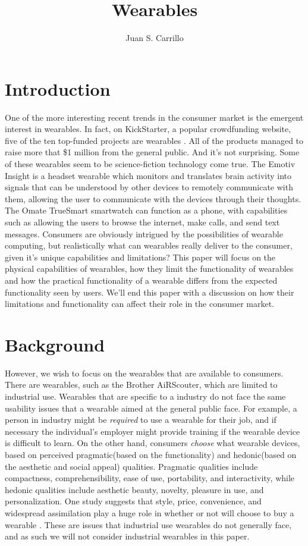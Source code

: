 \documentclass[11pt]{article}
\title{Wearables}
\author{Juan S. Carrillo}
\begin{document}
\maketitle
\section{Introduction}
One of the more interesting recent trends in the consumer market is the emergent interest in wearables. In fact, on KickStarter, a popular crowdfunding website, five of the ten top-funded projects are wearables \cite{VandricoTopTen}. All of the products managed to raise more that \$1 million from the general public. And it's not surprising. Some of these wearables seem to be science-fiction technology come true. The Emotiv Insight is a headset wearable which monitors and translates brain activity into signals that can be understood by other devices to remotely communicate with them, allowing the user to communicate with the devices through their thoughts. The Omate TrueSmart smartwatch can function as a phone, with capabilities such as allowing the users to browse the internet, make calls, and send text messages. Consumers are obviously intrigued by the possibilities of wearable computing, but realistically what can wearables really deliver to the consumer, given it's unique capabilities and limitations? This paper will focus on the physical capabilities of wearables, how they limit the functionality of wearables and how the practical functionality of a wearable differs from the expected functionality seen by users. We'll end this paper with a discussion on how their limitations and functionality can affect their role in the consumer market.
\section{Background}
 However, we wish to focus on the wearables that are available to consumers. There are wearables, such as the Brother AiRScouter, which are limited to industrial use. Wearables that are specific to a industry do not face the same usability issues that a wearable aimed at the general public face. For example, a person in industry might be \textit{required} to use a wearable for their job, and if necessary the individual's employer might provide training if the wearable device is difficult to learn. On the other hand, consumers \textit{choose} what wearable devices, based on perceived pragmatic(based on the functionality) and hedonic(based on the aesthetic and social appeal) qualities. Pragmatic qualities include compactness, comprehensibility, ease of use, portability, and interactivity, while hedonic qualities include aesthetic beauty, novelty, pleasure in use, and personalization\cite{UserAcceptance}. One study suggests that  style, price, convenience, and widespread assimilation play a huge role in whether or not will choose to buy a wearable \cite{WhyUsersDont}. These are issues that industrial use wearables do not generally face, and as such we will not consider industrial wearables in this paper. 
\end{document}
